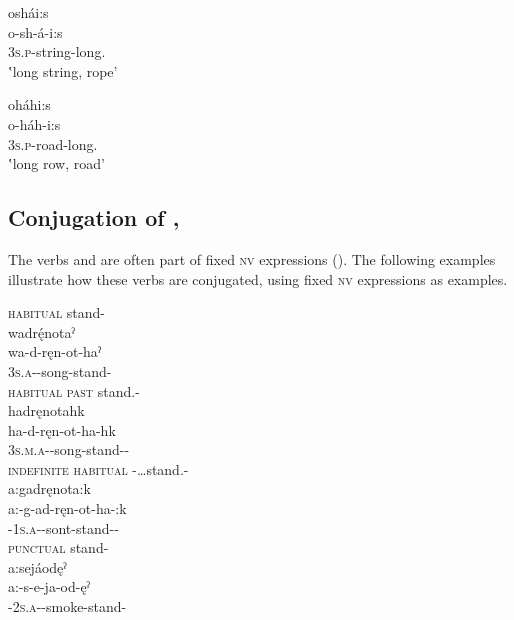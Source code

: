 \ex oshái:s\\
\gll o-sh-á-i:s \\
\textsc{3s.p}-string-long.{\stative}\\
\glt ‛long string, rope'

\ex oháhi:s\\
\gll o-háh-i:s\\
\textsc{3s.p}-road-long.{\stative}\\
\glt ‛long row, road'

\z
\z




\subsection{Conjugation of  ,  }

The verbs   and   are often part of fixed \textsc{nv} expressions (). The following examples illustrate how these verbs are conjugated, using fixed \textsc{nv} expressions as examples.

\ea\label{ex:od.stand}  
\ea \textsc{habitual}  stand-{\habitual}\\
\glll wadrę́notaˀ\\
wa-d-ręn-ot-haˀ\\
\textsc{3s.a}-{\semireflexive}-song-stand-{\habitual}\\
\glt {}
\ex \textsc{habitual past}  stand.{\habitual}-{\former}\\
\glll hadręnotahk \\
ha-d-ręn-ot-ha-hk\\
\textsc{3s.m.a}-{\semireflexive}-song-stand-{\habitual}-{\former}\\
\glt {} 
\ex \textsc{indefinite habitual}  {\indefinite}-…stand.{\habitual}-{\former}\\
\glll a:gadręnota:k \\
a:-g-ad-ręn-ot-ha-:k \\
\textsc{{\indefinite}-1s.a}-{\semireflexive}-sont-stand-{\habitual}-{\modalizer}\\
\glt {} 
\newpage
\ex \textsc{punctual}  stand-{\punctual}\\
\glll a:sejáodęˀ\\
a:-s-e-ja-od-ęˀ\\
\textsc{{\indefinite}-2s.a}-{\joinerE}-smoke-stand-{\punctual}\\
\glt {} 

